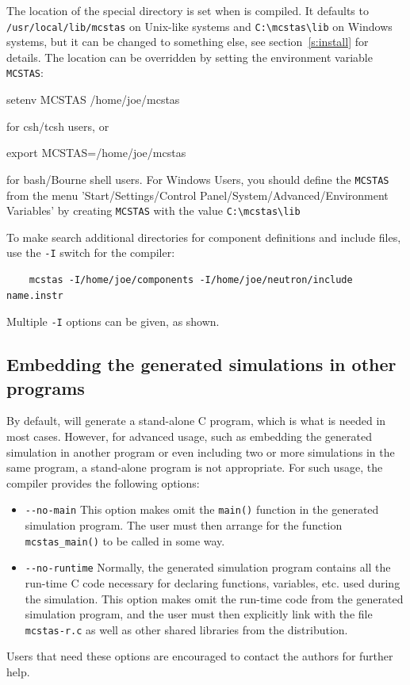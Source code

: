 The location of the special \MCS directory is set
when \MCS is compiled. It defaults to \verb+/usr/local/lib/mcstas+ on Unix-like
systems and \verb+C:\mcstas\lib+ on Windows systems, but it can be changed to
something else, see section~\ref{s:install} for details. The location can be
overridden by setting the environment variable \verb+MCSTAS+:
\begin{bash}
    setenv MCSTAS /home/joe/mcstas
\end{bash}
for csh/tcsh users, or
\begin{bash}
    export MCSTAS=/home/joe/mcstas
\end{bash}
for bash/Bourne shell users.  For Windows Users, you should define the
\verb+MCSTAS+ from the menu 'Start/Settings/Control
Panel/System/Advanced/Environment Variables' by creating \verb+MCSTAS+ with the
value \verb+C:\mcstas\lib+

To make \MCS search additional directories for component definitions
and include files, use the \verb+-I+ switch for the \MCS compiler:
\begin{lstlisting}
    mcstas -I/home/joe/components -I/home/joe/neutron/include name.instr
\end{lstlisting}
Multiple \verb+-I+ options can be given, as shown.


\subsection{Embedding the generated simulations in other programs}

By default, \MCS will generate a stand-alone C program, which is what is needed
in most cases. However, for advanced usage, such as embedding the generated
simulation in another program or even including two or more simulations in the
same program, a stand-alone program is not appropriate. For such usage, the
\MCS compiler provides the following options:
\begin{itemize}
\item \verb+--no-main+ This option makes \MCS omit the \verb+main()+ function
  in the generated simulation program. The user must then arrange for the
  function \verb+mcstas_main()+ to be called in some way.
\item \verb+--no-runtime+ Normally, the
  generated simulation program contains all the run-time C code necessary for
  declaring functions, variables, etc. used during the simulation.  This
  option makes \MCS omit the run-time code from the generated
  simulation program, and the user must then explicitly link with the file
  \verb+mcstas-r.c+ as well as other shared libraries from the \MCS{} distribution.
\end{itemize}
Users that need these options are encouraged to contact the authors for further
help.


